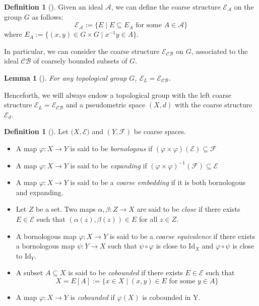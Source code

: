 \documentclass[twoside]{amsart}
\theoremstyle{plain}
\newtheorem{lemma}[theorem]{Lemma}
\theoremstyle{break}
\theoremstyle{definition}
\newtheorem{definition}[theorem]{Definition}
\theoremstyle{remark}
\newcommand{\A}{\mathcal A}
\begin{document}
\begin{definition}[{\cite[Defn.~2.10]{rosendal}}]\label{def:cs_ideal}
    Given an ideal $\A$, we can define the coarse structure
    $\mathcal{E_A}$ on the group $G$ as follows:
    \[
    \mathcal{E_A}:=\{E\mid E\subseteq E_A\text{ for some }A\in\mathcal{A}\}
  \] 
    where $E_A:=\{(x,y)\in G\times G\mid x^{-1}y\in A\}$.
\end{definition}

In particular, 
we can consider the coarse structure $\mathcal{E_{CB}}$ on $G$, associated to the ideal $\mathcal{CB}$ of coarsely bounded subsets of $G$. 

\begin{lemma}[{\cite[Cor.~2.23]{rosendal}}]\label{lem:Eob}
  For any topological group $G$, $\mathcal{E}_L = \mathcal{E}_{\mathcal{CB}}$.
\end{lemma}
\noindent
  Henceforth, we will always endow a topological group with
  the left coarse structure $\mathcal{E}_L =
\mathcal{E}_{\mathcal{CB}}$ and a pseudometric space $(X,d)$ with
the coarse structure $\mathcal{E}_d$.

\begin{definition}[{\cite[Defn.~2.43]{rosendal}}]\label{def:coarse_equivalence}
  Let $(X,\mathcal{E)}$ and $(Y,\mathcal{F})$ be coarse spaces.
  \begin{itemize} \item A map $\varphi:X\rightarrow Y$ is said to be
    \textit{bornologous} if
    $(\varphi\times\varphi)(\mathcal{E})\subseteq\mathcal{F}$

    \item A map $\varphi:X\rightarrow Y$ is said to be \textit{expanding} if
      $(\varphi\times\varphi)^{-1}(\mathcal{F})\subseteq\mathcal{E}$

    \item A map $\varphi:X\rightarrow Y$ is said to be a \textit{coarse
      embedding} if it is both bornologous and expanding.

    \item Let $Z$ be a set. Two maps $\alpha,\beta:Z\rightarrow X$
      are said to be \textit{close} if there exists $E\in\mathcal{E}$ such
      that $(\alpha(z),\beta(z))\in E$ for all $z\in Z$.

    \item A bornologous map $\varphi:X\rightarrow Y$ is said to be a
      \textit{coarse equivalence} if there exists a bornologous map
      $\psi:Y\rightarrow X$ such that  $\psi\circ\varphi$ is close
      to $\text{Id}_X$ and $\varphi\circ\psi$ is close to
      $\text{Id}_Y$.

    \item A subset $A\subseteq X$ is said to be \textit{cobounded} if there
      exists $E\in\mathcal{E}$ such that $$ X=E[A]:=\{x\in X\mid
      (x,y)\in E\text{ for some }y\in A\} $$

  \item A map $\varphi:X\rightarrow Y$ is \textit{cobounded} if $\varphi(X)$
is cobounded in Y. 
\end{itemize} 
\end{definition}
\end{document}
